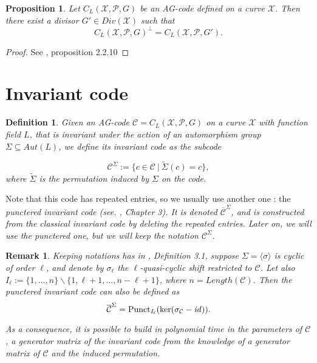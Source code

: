 \documentclass[10pt]{article}
\newtheorem{def1}{Definition}[]
\newtheorem{prop1}{Proposition}[]
\newtheorem{rq1}{Remark}[]
\newcommand{\s}{\vspace{0.3cm}}
\newcommand{\su}{\subseteq}
\newcommand{\X}{\mathcal{X}}
\newcommand{\PR}{\mathcal{P}}
\begin{document}
\s

\begin{prop1} \label{dual}
Let $C_L(\X,\PR,G)$ be an AG-code defined on a curve $\X$. Then there exist a divisor $G' \in Div(\X)$ such that 
\[C_L(\X,\PR,G)^{\perp} = C_L(\X,\PR,G').\]
\end{prop1}

\s

\begin{proof}
See \cite{Sti}, proposition 2.2.10
\end{proof}

\section{Invariant code}

\s

\begin{def1} Given an AG-code $\mathcal{C} = C_L(\X,\PR,G)$ on a curve $\X$ with function field $L$, that is invariant under the action of an automorphism group $\Sigma \su Aut(L)$, we define its invariant code as the subcode 

\[\mathcal{C}^{\Sigma} := \{c \in \mathcal{C} \ | \ \tilde{\Sigma}(c)=c\},\]
where $\tilde{\Sigma}$ is the permutation induced by $\Sigma$ on the code.
\end{def1}
\s

Note that this code has repeated entries, so we usually use another one : the \it{punctered invariant code} \rm (see. \cite{Bar}, Chapter 3). It is denoted $\overline{\mathcal{C}}^{\Sigma}$, and is constructed from the classical invariant code by deleting the repeated entries. Later on, we will use the punctered one, but we will keep the notation $\mathcal{C}^{\Sigma}$. 

\s

\begin{rq1} \rm \label{gen inv}
Keeping notations has in \cite{Bar}, Definition 3.1, suppose $\Sigma = \langle \sigma \rangle$ is cyclic of order $\ell$, and denote by $\sigma_{\ell}$ the $\ell$-quasi-cyclic shift restricted to $\mathcal{C}$. Let also $I_{\ell} := \{1,...,n\}\backslash \{1,\ell+1,...,n-\ell+1\}$, where $n=Length(\mathcal{C})$. Then the punctered invariant code can also be defined as
\[ \overline{\mathcal{C}}^{\Sigma} = \rm Punct_{\it I_{\ell}}(\rm ker (\it \sigma_{\mathcal{C}}-id)).\]

\s

As a consequence, it is possible to build in polynomial time in the parameters of $\mathcal{C}$, a generator matrix of the invariant code from the knowledge of a generator matrix of $\mathcal{C}$ and the induced permutation. 
\end{rq1}
\end{document}
